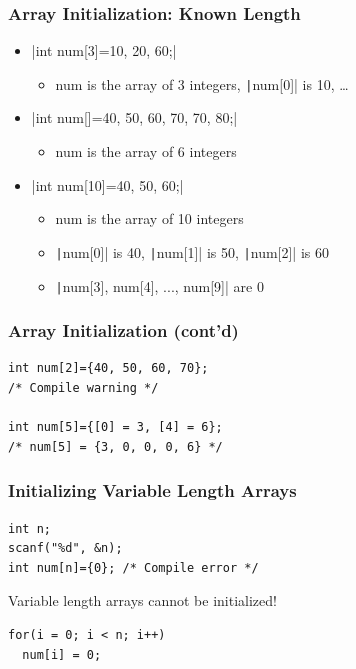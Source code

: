 \documentclass{../c-lecture}
\begin{document}
\begin{frame}[fragile]
  \frametitle{Array Initialization: Known Length}
  \begin{itemize}
    \item {}|int num[3]={10, 20, 60};|
    \begin{itemize}
      \item num is the array of 3 integers, \texttt|num[0]| is 10, \ldots
    \end{itemize}

    \item {}|int num[]={40, 50, 60, 70, 70, 80};|
    \begin{itemize}
      \item num is the array of 6 integers
    \end{itemize}

    \item {}|int num[10]={40, 50, 60};|
    \begin{itemize}
      \item num is the array of 10 integers
      \item \texttt|num[0]| is 40, \texttt|num[1]| is 50, \texttt|num[2]| is 60
      \item \texttt|num[3], num[4], ..., num[9]| are 0
    \end{itemize}
  \end{itemize}
\end{frame}

\begin{frame}[fragile]
  \frametitle{Array Initialization (cont’d)}
  \begin{verbatim}
int num[2]={40, 50, 60, 70};
/* Compile warning */

int num[5]={[0] = 3, [4] = 6};
/* num[5] = {3, 0, 0, 0, 6} */
  \end{verbatim}
\end{frame}

\begin{frame}[fragile]
  \frametitle{Initializing Variable Length Arrays}
  \begin{verbatim}
int n;
scanf("%d", &n);
int num[n]={0}; /* Compile error */
  \end{verbatim}
  \begin{block}{}
    Variable length arrays cannot be initialized!
  \end{block}
  \begin{verbatim}
for(i = 0; i < n; i++)
  num[i] = 0;
  \end{verbatim}
\end{frame}
\end{document}
